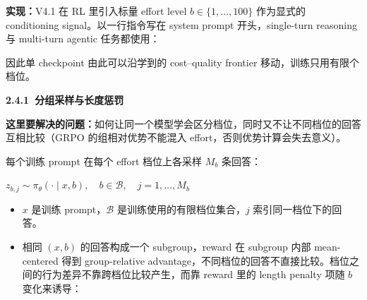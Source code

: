 \documentclass[zihao=false,fontset=windows]{ctexart}
\newcommand{\bigmath}[1]{%
  \begin{center}\large$\displaystyle #1$\end{center}%
}
\begin{document}
\textbf{实现：}V4.1 在 RL 里引入标量 effort level $b\in\{1,\ldots,100\}$ 作为显式的 conditioning signal。以一行指令写在 system prompt 开头，single-turn reasoning 与 multi-turn agentic 任务都使用：\par


因此单 checkpoint 由此可以沿学到的 cost–quality frontier 移动，训练只用有限个档位。\par

\par{}\vspace{0.8em}\noindent \begin{tcolorbox}[boxrule=0pt,arc=3pt,colback=callGreen,left=3pt,right=3pt,top=2pt,bottom=2pt,before skip=0pt,after skip=0pt]{\bfseries \textcolor{feishuBlue}{2.4.1}\ 分组采样与长度惩罚}\end{tcolorbox}\par\vspace{0.28em}

\begin{feishuquote}

\textbf{这里要解决的问题：}如何让同一个模型学会区分档位，同时又不让不同档位的回答互相比较（GRPO 的组相对优势不能混入 effort，否则优势计算会失去意义）。\par
\end{feishuquote}

每个训练 prompt 在每个 effort 档位上各采样 $M_b$ 条回答：\par

\bigmath{z_{b,j}\sim\pi_\theta(\cdot\mid x,b),\quad b\in\mathcal{B},\quad j=1,\ldots,M_b}
\begin{itemize}
\item 
$x$ 是训练 prompt，$\mathcal{B}$ 是训练使用的有限档位集合，$j$ 索引同一档位下的回答。\par
\item 
相同 $(x,b)$ 的回答构成一个 subgroup，reward 在 subgroup 内部 mean-centered 得到 group-relative advantage，不同档位的回答不直接比较。档位之间的行为差异不靠跨档位比较产生，而靠 reward 里的 length penalty 项随 $b$ 变化来诱导：\par
\end{itemize}
\end{document}
